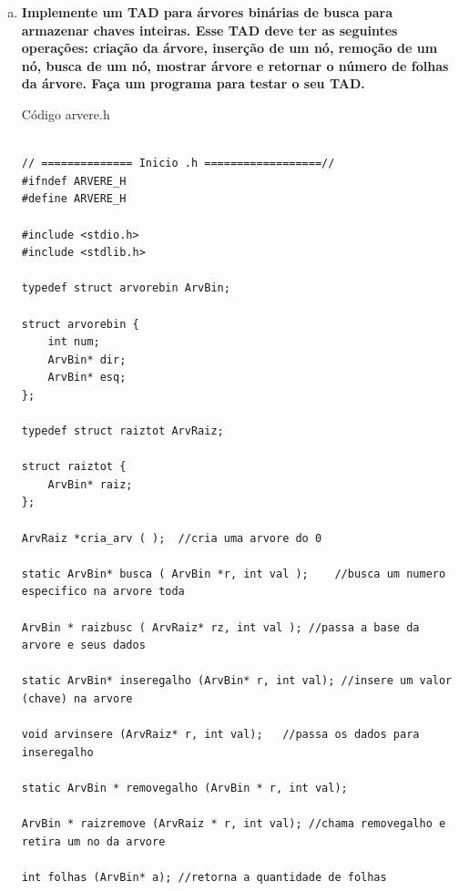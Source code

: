 \documentclass[11pt]{article} %
\begin{document}
\begin{enumerate}[a)]
	Pseudo-Código do percurso Pós-Ordem:
	\begin{lstlisting}
	void pos_ordem ( ArvRaiz *raiz ){

		if ( raiz != NULL ){
			pos_ordem ( raiz -> esquerda );
			pos_ordem ( raiz -> direita );
			printf ("%d\n", raiz -> num );
		}
	}


	\end{lstlisting}

\newpage
	
	 	   \item  {\bf Implemente um TAD para árvores binárias de busca para armazenar chaves inteiras. Esse TAD deve ter as seguintes operações: criação da árvore, inserção de um nó, remoção de um nó, busca de um nó, mostrar árvore e retornar o número de folhas da árvore. Faça um programa para testar o seu TAD.} \\

\begin{center}
Código arvere.h
\end{center}

			\begin{lstlisting}
			
// ============== Inicio .h ==================//
#ifndef ARVERE_H
#define ARVERE_H

#include <stdio.h>
#include <stdlib.h>

typedef struct arvorebin ArvBin;

struct arvorebin {
	int num;
	ArvBin* dir;
	ArvBin* esq;
};

typedef struct raiztot ArvRaiz;

struct raiztot {
	ArvBin* raiz;
};

ArvRaiz *cria_arv ( );	//cria uma arvore do 0

static ArvBin* busca ( ArvBin *r, int val );	//busca um numero especifico na arvore toda

ArvBin * raizbusc ( ArvRaiz* rz, int val );	//passa a base da arvore e seus dados

static ArvBin* inseregalho (ArvBin* r, int val); //insere um valor (chave) na arvore

void arvinsere (ArvRaiz* r, int val);	//passa os dados para inseregalho

static ArvBin * removegalho (ArvBin * r, int val);

ArvBin * raizremove (ArvRaiz * r, int val);	//chama removegalho e retira um no da arvore

int folhas (ArvBin* a);	//retorna a quantidade de folhas


\end{lstlisting}
\end{enumerate}
\end{document}
